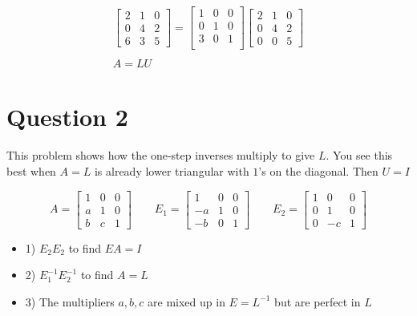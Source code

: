 \documentclass[9pt]{article}
\theoremstyle{plain}
\begin{document}
\[
	\begin{gathered}
		\begin{bmatrix}
			2 & 1 & 0 \\
			0 & 4 & 2 \\
			6 & 3 & 5
		\end{bmatrix}
		=
		\begin{bmatrix}
			1 & 0 & 0 \\
			0 & 1 & 0 \\
			3 & 0 & 1 \\
		\end{bmatrix}
		\begin{bmatrix}
			2 & 1 & 0 \\
			0 & 4 & 2 \\
			0 & 0 & 5
		\end{bmatrix} \\ \\
		A = LU
	\end{gathered}
\]

\section{Question 2}
\begin{center}
	This problem shows how the one-step inverses multiply to give $L$.
	You see this best when $A = L$ is already lower triangular with $1$'s on the diagonal. Then $U=I$
\end{center}
\[
	A =
	\begin{bmatrix}
		1 & 0 & 0 \\
		a & 1 & 0 \\
		b & c & 1
	\end{bmatrix} \quad\quad
	E_1 =
	\begin{bmatrix}
		1  & 0 & 0 \\
		-a & 1 & 0 \\
		-b & 0 & 1
	\end{bmatrix} \quad\quad
	E_2 =
	\begin{bmatrix}
		1 & 0  & 0 \\
		0 & 1  & 0 \\
		0 & -c & 1
	\end{bmatrix}
\]
\begin{itemize}
	\item  1) $E_2E_2$ to find $EA=I$
	\item  2) $E_1^{-1}E_2^{-1}$ to find $A=L$
	\item  3) The multipliers $a,b,c$ are mixed up in $E = L^{-1}$ but are perfect in $L$
\end{itemize}
\end{document}
